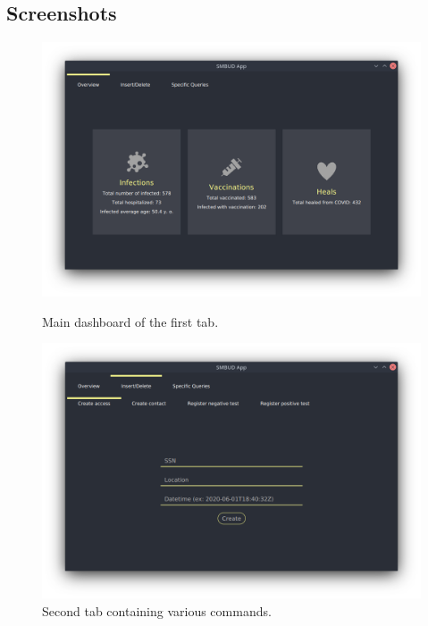 \documentclass[12pt, a4paper]{article}
\begin{document}
\clearpage

\subsection{Screenshots}

\setlength\abovecaptionskip{-0.5cm} %

\begin{figure}[h]
        \centering

        \includegraphics[width=.8\linewidth]{app_1.png}
        \caption*{Main dashboard of the first tab.} %

        \includegraphics[width=.8\linewidth]{app_2.png}
        \caption*{Second tab containing various commands.} %
\end{figure}
\end{document}
